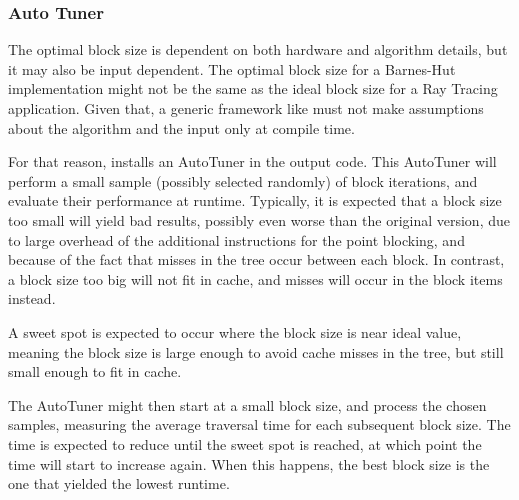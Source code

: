 \subsubsection{Auto Tuner}
\label{sec:optim:tuner}
The optimal block size is dependent on both hardware and algorithm details, but it may also be input dependent. The optimal block size for a Barnes-Hut implementation might not be the same as the ideal block size for a Ray Tracing application. Given that, a generic framework like \treetiler must not make assumptions about the algorithm and the input only at compile time.

For that reason, \treetiler installs an AutoTuner in the output code. This AutoTuner will perform a small sample (possibly selected randomly) of block iterations, and evaluate their performance at runtime.
Typically, it is expected that a block size too small will yield bad results, possibly even worse than the original version, due to large overhead of the additional instructions for the point blocking, and because of the fact that misses in the tree occur between each block. In contrast, a block size too big will not fit in cache, and misses will occur in the block items instead.

A sweet spot is expected to occur where the block size is near ideal value, meaning the block size is large enough to avoid cache misses in the tree, but still small enough to fit in cache.

The AutoTuner might then start at a small block size, and process the chosen samples, measuring the average traversal time for each subsequent block size. The time is expected to reduce until the sweet spot is reached, at which point the time will start to increase again.
When this happens, the best block size is the one that yielded the lowest runtime.
